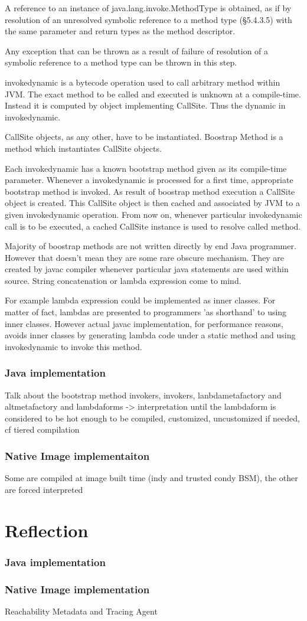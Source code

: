     A reference to an instance of java.lang.invoke.MethodType is obtained, as if by resolution of an unresolved symbolic reference to a method type (§5.4.3.5) with the same parameter and return types as the method descriptor.

    Any exception that can be thrown as a result of failure of resolution of a symbolic reference to a method type can be thrown in this step.


invokedynamic is a bytecode operation used to call arbitrary method within JVM. The exact method to be called and executed is unknown at a compile-time. Instead it is computed by object implementing CallSite. Thus the dynamic in invokedynamic.

CallSite objects, as any other, have to be instantiated. Boostrap Method is a method which instantiates CallSite objects.

Each invokedynamic has a known bootstrap method given as its compile-time parameter. Whenever a invokedynamic is processed for a first time, appropriate bootstrap method is invoked. As result of boostrap method execution a CallSite object is created. This CallSite object is then cached and associated by JVM to a given invokedynamic operation. From now on, whenever particular invokedynamic call is to be executed, a cached CallSite instance is used to resolve called method.

Majority of boostrap methods are not written directly by end Java programmer. However that doesn't mean they are some rare obscure mechanism. They are created by javac compiler whenever particular java statements are used within source. String concatenation or lambda expression come to mind.

For example lambda expression could be implemented as inner classes. For matter of fact, lambdas are presented to programmers 'as shorthand' to using inner classes. However actual javac implementation, for performance reasons, avoids inner classes by generating lambda code under a static method and using invokedynamic to invoke this method.
\subsubsection{Java implementation}
Talk about the bootstrap method invokers, invokers, lanbdametafactory and altmetafactory and lambdaforms -> interpretation until the lambdaform is
considered to be hot enough to be compiled, customized, uncustomized if needed, cf tiered compilation
\subsubsection{Native Image implementaiton}
Some are compiled at image built time (indy and trusted condy BSM), the other are forced interpreted


\section{Reflection}

\subsubsection{Java implementation}

\subsubsection{Native Image implementation}
Reachability Metadata and Tracing Agent

 